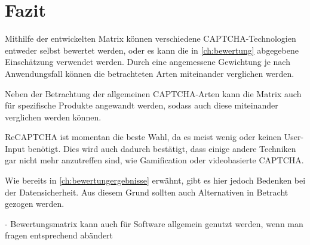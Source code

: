 \chapter{Fazit}

Mithilfe der entwickelten Matrix können verschiedene CAPTCHA-Technologien entweder selbst bewertet werden,
oder es kann die in \autoref{ch:bewertung} abgegebene Einschätzung verwendet werden.
Durch eine angemessene Gewichtung je nach Anwendungsfall können die betrachteten Arten miteinander verglichen werden.

Neben der Betrachtung der allgemeinen CAPTCHA-Arten kann die Matrix auch für spezifische Produkte angewandt werden,
sodass auch diese miteinander verglichen werden können.

ReCAPTCHA ist momentan die beste Wahl, da es meist wenig oder keinen User-Input benötigt.
Dies wird auch dadurch bestätigt, dass einige andere Techniken gar nicht mehr anzutreffen sind,
wie Gamification oder videobasierte CAPTCHA. 

Wie bereits in \autoref{ch:bewertungergebnisse} erwähnt, gibt es hier jedoch Bedenken bei der Datensicherheit.
Aus diesem Grund sollten auch Alternativen in Betracht gezogen werden. 

- Bewertungsmatrix kann auch für Software allgemein genutzt werden, wenn man fragen entsprechend abändert 
